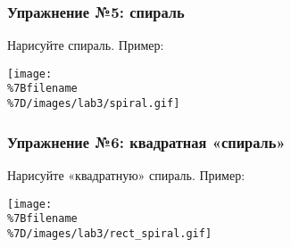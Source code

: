 \subsubsection{Упражнение №5:
спираль}\label{ux443ux43fux440ux430ux436ux43dux435ux43dux438ux435-5-ux441ux43fux438ux440ux430ux43bux44c}

Нарисуйте спираль. Пример:

\texttt{[image: \\\%7Bfilename\\\%7D/images/lab3/spiral.gif]}

\begin{Shaded}
\begin{Highlighting}[]
 
 

\OperatorTok{=} 
\OperatorTok{=} 

\NormalTok{)}

  \NormalTok{(}\NormalTok{):}
    \OperatorTok{=} \OperatorTok{/}
      
        \OperatorTok{=} \OperatorTok{*}\OperatorTok{*}\OperatorTok{/}
        \OperatorTok{=} \OperatorTok{*}\NormalTok{(}\OperatorTok{/}
        \OperatorTok{-}
        \OperatorTok{+=} 
\end{Highlighting}
\end{Shaded}

\subsubsection{Упражнение №6: квадратная
«спираль»}\label{ux443ux43fux440ux430ux436ux43dux435ux43dux438ux435-6-ux43aux432ux430ux434ux440ux430ux442ux43dux430ux44f-ux441ux43fux438ux440ux430ux43bux44c}

Нарисуйте «квадратную» спираль. Пример:

\texttt{[image: \\\%7Bfilename\\\%7D/images/lab3/rect\_spiral.gif]}

\begin{Shaded}
\begin{Highlighting}[]
 

\OperatorTok{=} 
  \NormalTok{(}\NormalTok{):}
    \NormalTok{)}
    \OperatorTok{+=} 
\end{Highlighting}
\end{Shaded}

